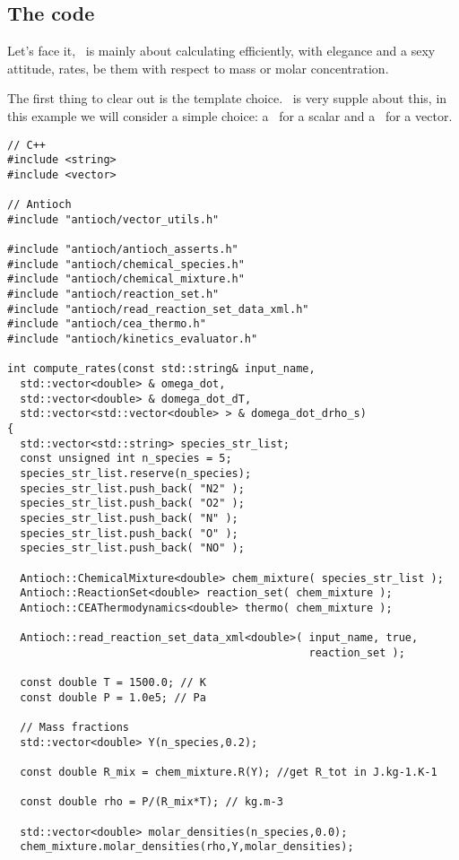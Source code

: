 \subsection{The code}

Let's face it, \Antioch\ is mainly about calculating
efficiently, with elegance and a sexy attitude, rates,
be them with respect to mass or molar concentration. 

The first thing to clear out is the template choice. 
\Antioch\ is very supple about this, in this example
we will consider a simple choice: a \double\ for a 
scalar and a \stdvector\ for a vector.

\linenumbers
\begin{verbatim}
// C++
#include <string>
#include <vector>

// Antioch
#include "antioch/vector_utils.h"

#include "antioch/antioch_asserts.h"
#include "antioch/chemical_species.h"
#include "antioch/chemical_mixture.h"
#include "antioch/reaction_set.h"
#include "antioch/read_reaction_set_data_xml.h"
#include "antioch/cea_thermo.h"
#include "antioch/kinetics_evaluator.h"

int compute_rates(const std::string& input_name,
  std::vector<double> & omega_dot,
  std::vector<double> & domega_dot_dT,
  std::vector<std::vector<double> > & domega_dot_drho_s)
{
  std::vector<std::string> species_str_list;
  const unsigned int n_species = 5;
  species_str_list.reserve(n_species);
  species_str_list.push_back( "N2" );
  species_str_list.push_back( "O2" );
  species_str_list.push_back( "N" );
  species_str_list.push_back( "O" );
  species_str_list.push_back( "NO" );

  Antioch::ChemicalMixture<double> chem_mixture( species_str_list );
  Antioch::ReactionSet<double> reaction_set( chem_mixture );
  Antioch::CEAThermodynamics<double> thermo( chem_mixture );

  Antioch::read_reaction_set_data_xml<double>( input_name, true, 
                                               reaction_set );

  const double T = 1500.0; // K
  const double P = 1.0e5; // Pa

  // Mass fractions
  std::vector<double> Y(n_species,0.2);

  const double R_mix = chem_mixture.R(Y); //get R_tot in J.kg-1.K-1

  const double rho = P/(R_mix*T); // kg.m-3

  std::vector<double> molar_densities(n_species,0.0);
  chem_mixture.molar_densities(rho,Y,molar_densities);


\end{verbatim}
